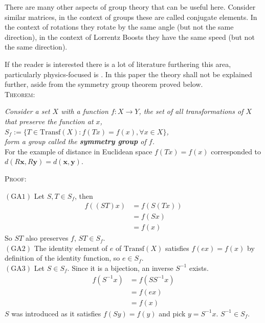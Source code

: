 \documentclass[twocolumn,floatfix,aps,prd,amsmath,amssymb]{revtex4}
\begin{document}
 There are many other aspects of group theory that can be useful here. Consider similar matrices, in the context of groups these are called conjugate elements. In the context of rotations they rotate by the same angle (but not the same direction), in the context of Lorrentz Boosts they have the same speed (but not the same direction).
 
 If the reader is interested there is a lot of literature furthering this area, particularly physics-focused is \cite{SCPV3}. In this paper the theory shall not be explained further, aside from the symmetry group theorem proved below. 
\vspace{2mm} \\
\textsc{Theorem:}

{\centering \textit{Consider a set $X$ with a function $f:X\rightarrow Y$, the set of all transformations of $X$ that preserve the function at $x$,\\
$S_f:=\{ T \in \mathrm{Transf}(X) : f(Tx)=f(x), \forall x \in X \}$,\\
form a group called the \textbf{symmetry group} of $f$.}}
\vspace{2mm} \\

For the example of distance in Euclidean space $f(Tx)=f(x)$ corresponded to $d(R\mathbf{x},R\mathbf{y}) = d(\mathbf{x},\mathbf{y})$.
\newpage 

\begin{flushleft}\textsc{Proof:} \end{flushleft}

$(\mathrm{GA}1)$ Let $S,T\in S_f$, then
\begin{align*}
f((ST)x)&=f(S(Tx)) \\
&= f(Sx) \\
&= f(x)
\end{align*}
So $ST$ also preserves $f$, $ST \in S_f$. \\

$(\mathrm{GA}2)$ The identity element of $e$ of $\mathrm{Transf}(X)$ satisfies $f(ex)=f(x)$ by definition of the identity function, so $e \in S_f$.\\

$(\mathrm{GA}3)$  Let $S \in S_f$. Since it is a bijection, an inverse $S^{-1}$ exists. 
\begin{align*}
f(S^{-1}x) &= f(SS^{-1}x) \\
 &= f(ex) \\
  &= f(x)
\end{align*}
$S$ was introduced as it satisfies $f(Sy)=f(y)$ and pick $y=S^{-1}x$. $S^{-1} \in S_f$.\\
\end{document}
